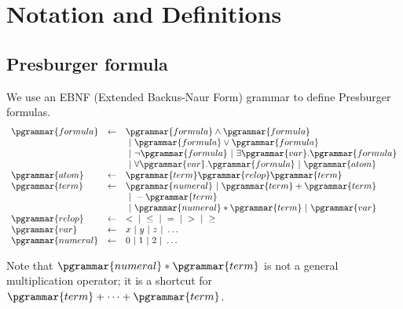 \section{Notation and Definitions}

\subsection{Presburger formula\label{presburger}}

We use an EBNF (Extended Backus-Naur Form) grammar to define Presburger formulas.
\[
\begin{array}{lcl}
\pgrammar{formula} & \gets &  \pgrammar{formula} \wedge \pgrammar{formula} \\ 
        & & ~|~ \pgrammar{formula} \vee   \pgrammar{formula} \\
        & & ~|~ \neg \pgrammar{formula} 
        ~|~ \exists \pgrammar{var}. \pgrammar{formula} \\
        & & ~|~ \forall \pgrammar{var}. \pgrammar{formula}
        ~|~ \pgrammar{atom} \\
                            
\pgrammar{atom} & \gets &  \pgrammar{term} \pgrammar{relop} \pgrammar{term}
                            \\
\pgrammar{term} & \gets &     \pgrammar{numeral}
        ~|~ \pgrammar{term} + \pgrammar{term} \\
        & & ~|~ -\pgrammar{term} \\
        & & ~|~ \pgrammar{numeral} * \pgrammar{term}
        ~|~ \pgrammar{var}
                            \\
\pgrammar{relop} & \gets &    <
        ~|~ \leq
                            ~|~ =
                            ~|~ >
                            ~|~ \geq
                            \\
\pgrammar{var} & \gets &      x
                            ~|~ y
                            ~|~ z
                            ~|~ \dots
                            \\
\pgrammar{numeral} & \gets &  0
                            ~|~ 1
                            ~|~ 2
                            ~|~ \dots
                            \\
\end{array}
\]

Note that $\pgrammar{numeral} * \pgrammar{term}$ is not a general multiplication operator;
it is a shortcut for $\pgrammar{term}+\dots+\pgrammar{term}$.

